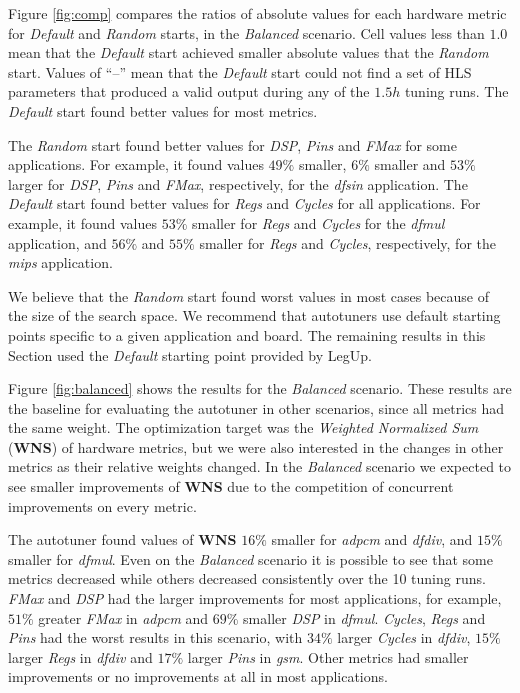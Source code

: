 Figure \ref{fig:comp} compares the ratios of absolute values for each hardware
metric for \textit{Default} and \textit{Random} starts, in the
\textit{Balanced} scenario.  Cell values less than $1.0$ mean that the
\textit{Default} start achieved smaller absolute values that the
\textit{Random} start.  Values of ``--'' mean that the \textit{Default} start
could not find a set of HLS parameters that produced a valid output during any
of the $1.5h$ tuning runs. The \textit{Default} start found better values for
most metrics.

The \textit{Random} start found better values for \textit{DSP}, \textit{Pins}
and \textit{FMax} for some applications. For example, it found values $49\%$
smaller, $6\%$ smaller and $53\%$ larger for \textit{DSP}, \textit{Pins} and
\textit{FMax}, respectively, for the \textit{dfsin} application. The
\textit{Default} start found better values for \textit{Regs} and
\textit{Cycles} for all applications. For example, it found values $53\%$
smaller for \textit{Regs} and \textit{Cycles} for the \textit{dfmul}
application, and $56\%$ and $55\%$ smaller for \textit{Regs} and
\textit{Cycles}, respectively, for the \textit{mips} application.

We believe that the \textit{Random} start found worst values in most cases
because of the size of the search space. We recommend that autotuners use
default starting points specific to a given application and board.  The
remaining results in this Section used the \textit{Default} starting point
provided by LegUp.

Figure \ref{fig:balanced} shows the results for the \textit{Balanced} scenario.
These results are the baseline for evaluating the autotuner in other scenarios,
since all metrics had the same weight.  The optimization target was the
\textit{Weighted Normalized Sum} (\textbf{WNS}) of hardware metrics, but we
were also interested in the changes in other metrics as their relative weights
changed. In the \textit{Balanced} scenario we expected to see smaller
improvements of \textbf{WNS} due to the competition of concurrent improvements
on every metric.

The autotuner found values of \textbf{WNS} $16\%$ smaller for \textit{adpcm}
and \textit{dfdiv}, and $15\%$ smaller for \textit{dfmul}.  Even on the
\textit{Balanced} scenario it is possible to see that some metrics decreased
while others decreased consistently over the 10 tuning runs. \textit{FMax} and
\textit{DSP} had the larger improvements for most applications, for example,
$51\%$ greater \textit{FMax} in \textit{adpcm} and $69\%$ smaller \textit{DSP}
in \textit{dfmul}.  \textit{Cycles}, \textit{Regs} and \textit{Pins} had the
worst results in this scenario, with $34\%$ larger \textit{Cycles} in
\textit{dfdiv}, $15\%$ larger \textit{Regs} in \textit{dfdiv} and $17\%$ larger
\textit{Pins} in \textit{gsm}.  Other metrics had smaller improvements or no
improvements at all in most applications.

